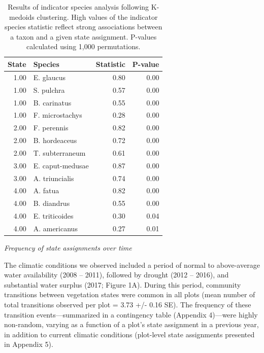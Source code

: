 \documentclass[twoside,12pt,final]{ucthesis-CA2012}
\begin{document}
\begin{ucmainmatter}
\begin{figure}
\end{figure}
\begin{table}[ht]
\centering
\begin{tabular}{rlrr}
  \hline
State & Species & Statistic & P-value \\ 
  \hline
1.00 & E. glaucus & 0.80 & 0.00 \\ 
  1.00 & S. pulchra & 0.57 & 0.00 \\ 
  1.00 & B. carinatus & 0.55 & 0.00 \\ 
  1.00 & F. microstachys & 0.28 & 0.00 \\ 
  2.00 & F. perennis & 0.82 & 0.00 \\ 
  2.00 & B. hordeaceus & 0.72 & 0.00 \\ 
  2.00 & T. subterraneum & 0.61 & 0.00 \\ 
  3.00 & E. caput-medusae & 0.87 & 0.00 \\ 
  3.00 & A. triuncialis & 0.74 & 0.00 \\ 
  4.00 & A. fatua & 0.82 & 0.00 \\ 
  4.00 & B. diandrus & 0.55 & 0.00 \\ 
  4.00 & E. triticoides & 0.30 & 0.04 \\ 
  4.00 & A. americanus & 0.27 & 0.01 \\ 
   \hline
\end{tabular}
\caption{Results of indicator species analysis following K-medoids clustering. High values of the indicator species statistic reflect strong associations between a taxon and a given state assignment. P-values calculated using 1,000 permutations.} 
\end{table}
\emph{Frequency of state assignments over time}

The climatic conditions we observed included a period of normal to above-average water availability (2008 -- 2011), followed by drought (2012 -- 2016), and substantial water surplus (2017; Figure 1A).
During this period, community transitions between vegetation states were common in all plots (mean number of total transitions observed per plot = 3.73 +/- 0.16 SE).
The frequency of these transition events---summarized in a contingency table (Appendix 4)---were highly non-random, varying as a function of a plot's state assignment in a previous year, in addition to current climatic conditions (plot-level state assignments presented in Appendix 5).


\end{ucmainmatter}
\end{document}
